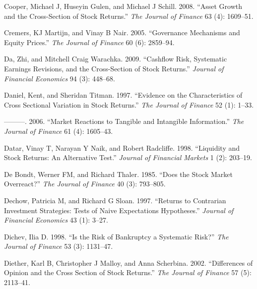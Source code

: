 \documentclass[
  letterpaper,
  DIV=11,
  numbers=noendperiod]{scrreprt}
\newlength{\cslhangindent}
\newlength{\cslentryspacingunit} %
\newenvironment{CSLReferences}[2] %
 {%
  \setlength{\parindent}{0pt}
  \ifodd #1
  \let\oldpar\par
  \def\par{\hangindent=\cslhangindent\oldpar}
  \fi
  \setlength{\parskip}{#2\cslentryspacingunit}
 }%
 {}
\begin{document}
\begin{CSLReferences}{1}{0}
\leavevmode{}%
Cooper, Michael J, Huseyin Gulen, and Michael J Schill. 2008. {``Asset
Growth and the Cross-Section of Stock Returns.''} \emph{The Journal of
Finance} 63 (4): 1609--51.

\leavevmode{}%
Cremers, KJ Martijn, and Vinay B Nair. 2005. {``Governance Mechanisms
and Equity Prices.''} \emph{The Journal of Finance} 60 (6): 2859--94.

\leavevmode{}%
Da, Zhi, and Mitchell Craig Warachka. 2009. {``Cashflow Risk, Systematic
Earnings Revisions, and the Cross-Section of Stock Returns.''}
\emph{Journal of Financial Economics} 94 (3): 448--68.

\leavevmode{}%
Daniel, Kent, and Sheridan Titman. 1997. {``Evidence on the
Characteristics of Cross Sectional Variation in Stock Returns.''}
\emph{The Journal of Finance} 52 (1): 1--33.

\leavevmode{}%
---------. 2006. {``Market Reactions to Tangible and Intangible
Information.''} \emph{The Journal of Finance} 61 (4): 1605--43.

\leavevmode{}%
Datar, Vinay T, Narayan Y Naik, and Robert Radcliffe. 1998. {``Liquidity
and Stock Returns: An Alternative Test.''} \emph{Journal of Financial
Markets} 1 (2): 203--19.

\leavevmode{}%
De Bondt, Werner FM, and Richard Thaler. 1985. {``Does the Stock Market
Overreact?''} \emph{The Journal of Finance} 40 (3): 793--805.

\leavevmode{}%
Dechow, Patricia M, and Richard G Sloan. 1997. {``Returns to Contrarian
Investment Strategies: Tests of Naive Expectations Hypotheses.''}
\emph{Journal of Financial Economics} 43 (1): 3--27.

\leavevmode{}%
Dichev, Ilia D. 1998. {``Is the Risk of Bankruptcy a Systematic Risk?''}
\emph{The Journal of Finance} 53 (3): 1131--47.

\leavevmode{}%
Diether, Karl B, Christopher J Malloy, and Anna Scherbina. 2002.
{``Differences of Opinion and the Cross Section of Stock Returns.''}
\emph{The Journal of Finance} 57 (5): 2113--41.


\end{CSLReferences}
\end{document}
